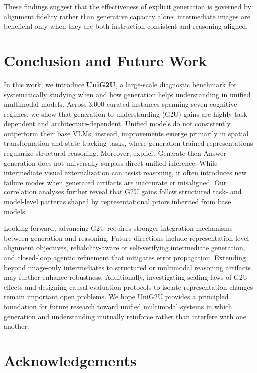 \documentclass{article}
\theoremstyle{plain}
\theoremstyle{definition}
\theoremstyle{remark}
\begin{document}
These findings suggest that the effectiveness of explicit generation is governed by alignment fidelity rather than generative capacity alone: 
intermediate images are beneficial only when they are both instruction-consistent and reasoning-aligned.


\section{Conclusion and Future Work}

In this work, we introduce \textbf{UniG2U}, a large-scale diagnostic benchmark for systematically studying when and how generation helps understanding in unified multimodal models. Across 3,000 curated instances spanning seven cognitive regimes, we show that generation-to-understanding (G2U) gains are highly task-dependent and architecture-dependent. Unified models do not consistently outperform their base VLMs; instead, improvements emerge primarily in spatial transformation and state-tracking tasks, where generation-trained representations regularize structural reasoning. Moreover, explicit Generate-then-Answer generation does not universally surpass direct unified inference. While intermediate visual externalization can assist reasoning, it often introduces new failure modes when generated artifacts are inaccurate or misaligned. Our correlation analyses further reveal that G2U gains follow structured task- and model-level patterns shaped by representational priors inherited from base models.

Looking forward, advancing G2U requires stronger integration mechanisms between generation and reasoning. Future directions include representation-level alignment objectives, reliability-aware or self-verifying intermediate generation, and closed-loop agentic refinement that mitigates error propagation. Extending beyond image-only intermediates to structured or multimodal reasoning artifacts may further enhance robustness. Additionally, investigating scaling laws of G2U effects and designing causal evaluation protocols to isolate representation changes remain important open problems. We hope UniG2U provides a principled foundation for future research toward unified multimodal systems in which generation and understanding mutually reinforce rather than interfere with one another.


\section*{Acknowledgements}
\end{document}
